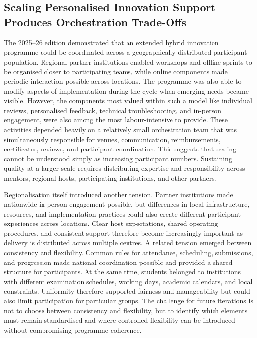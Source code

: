 \documentclass[runningheads]{llncs}
\begin{document}
\subsection{Scaling Personalised Innovation Support Produces Orchestration Trade-Offs}

The 2025–26 edition demonstrated that an extended hybrid innovation programme could be coordinated across a geographically distributed participant population. Regional partner institutions enabled workshops and offline sprints to be organised closer to participating teams, while online components made periodic interaction possible across locations. The programme was also able to modify aspects of implementation during the cycle when emerging needs became visible. However, the components most valued within such a model like individual reviews, personalised feedback, technical troubleshooting, and in-person engagement, were also among the most labour-intensive to provide. These activities depended heavily on a relatively small orchestration team that was simultaneously responsible for venues, communication, reimbursements, certificates, reviews, and participant coordination. This suggests that scaling cannot be understood simply as increasing participant numbers. Sustaining quality at a larger scale requires distributing expertise and responsibility across mentors, regional hosts, participating institutions, and other partners.

Regionalisation itself introduced another tension. Partner institutions made nationwide in-person engagement possible, but differences in local infrastructure, resources, and implementation practices could also create different participant experiences across locations. Clear host expectations, shared operating procedures, and consistent support therefore become increasingly important as delivery is distributed across multiple centres. A related tension emerged between consistency and flexibility. Common rules for attendance, scheduling, submissions, and progression made national coordination possible and provided a shared structure for participants. At the same time, students belonged to institutions with different examination schedules, working days, academic calendars, and local constraints. Uniformity therefore supported fairness and manageability but could also limit participation for particular groups. The challenge for future iterations is not to choose between consistency and flexibility, but to identify which elements must remain standardised and where controlled flexibility can be introduced without compromising programme coherence.
\end{document}
